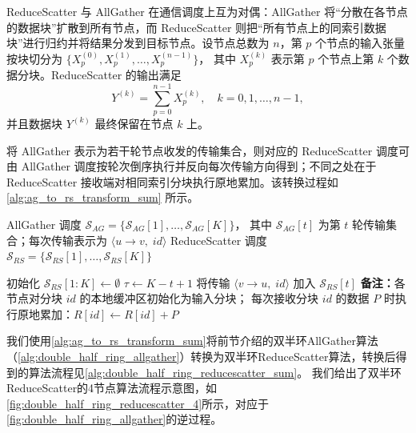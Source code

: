 ReduceScatter 与 AllGather 在通信调度上互为对偶：AllGather 将“分散在各节点的数据块”扩散到所有节点，而 ReduceScatter 则把“所有节点上的同索引数据块”进行归约并将结果分发到目标节点。设节点总数为 $n$，第 $p$ 个节点的输入张量按块切分为
$\{X_p^{(0)},X_p^{(1)},\dots,X_p^{(n-1)}\}$，
其中 $X_p^{(k)}$ 表示第 $p$ 个节点上第 $k$ 个数据分块。ReduceScatter 的输出满足
\begin{equation}
Y^{(k)}=\sum_{p=0}^{n-1}X_p^{(k)},\quad k=0,1,\dots,n-1,
\end{equation}
并且数据块 $Y^{(k)}$ 最终保留在节点 $k$ 上。

将 AllGather 表示为若干轮节点收发的传输集合，则对应的 ReduceScatter 调度可由 AllGather 调度按轮次倒序执行并反向每次传输方向得到；不同之处在于 ReduceScatter 接收端对相同索引分块执行原地累加。该转换过程如\autoref{alg:ag_to_rs_transform_sum} 所示。

\begin{algorithm}[!htbp]
\caption{由 AllGather 调度构造 ReduceScatter 调度的转换算法}
\label{alg:ag_to_rs_transform_sum}
\begin{algorithmic}[1]
\REQUIRE AllGather 调度 $\mathcal{S}_{AG}=\{\mathcal{S}_{AG}[1],\dots,\mathcal{S}_{AG}[K]\}$，
其中 $\mathcal{S}_{AG}[t]$ 为第 $t$ 轮传输集合；每次传输表示为 $\langle u\!\rightarrow\! v,\; id\rangle$
\ENSURE ReduceScatter 调度 $\mathcal{S}_{RS}=\{\mathcal{S}_{RS}[1],\dots,\mathcal{S}_{RS}[K]\}$

\STATE 初始化 $\mathcal{S}_{RS}[1:K]\leftarrow\emptyset$
    \STATE $\tau \leftarrow K-t+1$
        \STATE 将传输 $\langle v\!\rightarrow\! u,\; id\rangle$ 加入 $\mathcal{S}_{RS}[t]$
    \ENDFOR
\ENDFOR
\STATE \textbf{备注：}各节点对分块 $id$ 的本地缓冲区初始化为输入分块；
      每次接收分块 $id$ 的数据 $P$ 时执行原地累加：$R[id]\leftarrow R[id]+P$
\end{algorithmic}
\end{algorithm}

我们使用\autoref{alg:ag_to_rs_transform_sum}将前节介绍的双半环AllGather算法（\autoref{alg:double_half_ring_allgather}）转换为双半环ReduceScatter算法，转换后得到的算法流程见\autoref{alg:double_half_ring_reducescatter_sum}。
我们给出了双半环ReduceScatter的4节点算法流程示意图，如\autoref{fig:double_half_ring_reducescatter_4}所示，对应于\autoref{fig:double_half_ring_allgather}的逆过程。

